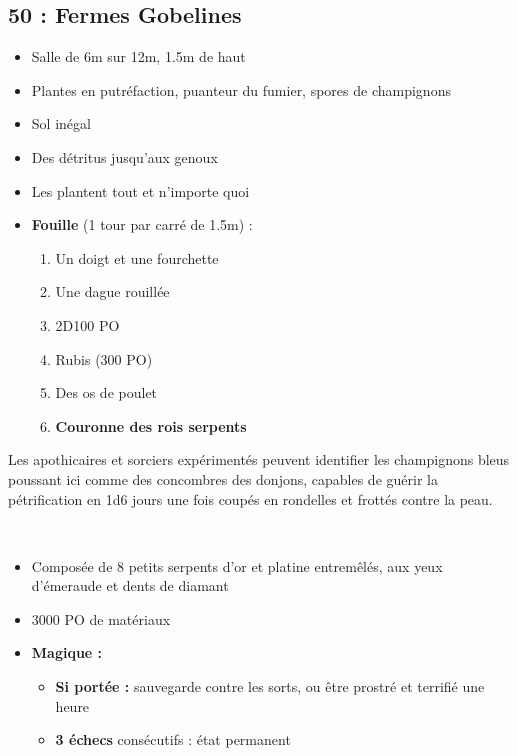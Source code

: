 \subsection{50 : Fermes Gobelines}\label{n3:s50}
\begin{itemize}
  \item Salle de 6m sur 12m, 1.5m de haut
  \item Plantes en putréfaction, puanteur du fumier, spores de champignons
  \item Sol inégal
  \item Des détritus jusqu'aux genoux
  \item Les \textbf{} plantent tout et n'importe quoi
  \item \textbf{Fouille} (1 tour par carré de 1.5m) :
  \begin{enumerate}
    \item Un doigt et une fourchette
    \item Une dague rouillée
    \item 2D100 PO
    \item Rubis (300 PO)
    \item Des os de poulet
    \item \textbf{Couronne des rois serpents}
  \end{enumerate}
\end{itemize}

Les apothicaires et sorciers expérimentés peuvent identifier les champignons bleus poussant ici comme des concombres des donjons, capables de guérir la pétrification en 1d6 jours une fois coupés en rondelles et frottés contre la peau.

\vfill
\
\begin{highlight}
  \begin{itemize}
    \item Composée de 8 petits serpents d'or et platine entremêlés, aux yeux d'émeraude et dents de diamant
    \item 3000 PO de matériaux
    \item \textbf{Magique :}
    \begin{itemize}
      \item \textbf{Si portée :} sauvegarde contre les sorts, ou être prostré et terrifié une heure
      \item \textbf{3 échecs} consécutifs : état permanent
    \end{itemize}
  \end{itemize}
\end{highlight}

